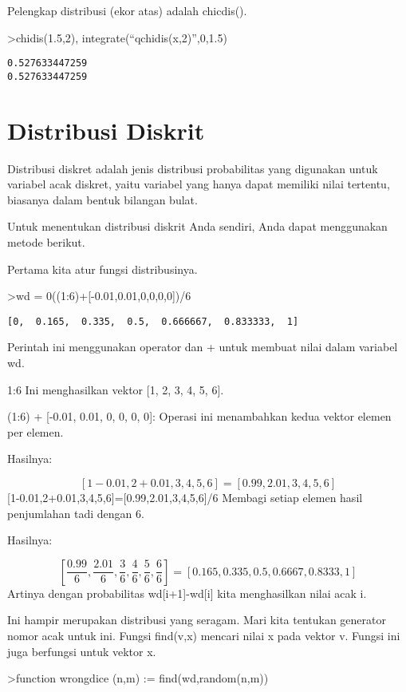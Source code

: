 \documentclass[
]{book}
\begin{document}
Pelengkap distribusi (ekor atas) adalah chicdis().

\textgreater chidis(1.5,2), integrate(``qchidis(x,2)'',0,1.5)

\begin{verbatim}
0.527633447259
0.527633447259
\end{verbatim}

\chapter{Distribusi Diskrit}\label{distribusi-diskrit}

Distribusi diskret adalah jenis distribusi probabilitas yang digunakan untuk variabel acak diskret, yaitu variabel yang hanya dapat memiliki nilai tertentu, biasanya dalam bentuk bilangan bulat.

Untuk menentukan distribusi diskrit Anda sendiri, Anda dapat menggunakan metode berikut.

Pertama kita atur fungsi distribusinya.

\textgreater wd = 0\textbar((1:6)+{[}-0.01,0.01,0,0,0,0{]})/6

\begin{verbatim}
[0,  0.165,  0.335,  0.5,  0.666667,  0.833333,  1]
\end{verbatim}

Perintah ini menggunakan operator \textbar{} dan + untuk membuat nilai dalam variabel wd.

1:6 Ini menghasilkan vektor {[}1, 2, 3, 4, 5, 6{]}.

(1:6) + {[}-0.01, 0.01, 0, 0, 0, 0{]}: Operasi ini menambahkan kedua vektor elemen per elemen.

Hasilnya:~

\[[1-0.01, 2+0.01, 3, 4, 5, 6] = [0.99, 2.01, 3, 4, 5, 6]\]{[}1-0.01,2+0.01,3,4,5,6{]}={[}0.99,2.01,3,4,5,6{]}/6 Membagi setiap elemen hasil penjumlahan tadi dengan 6.

Hasilnya:

\[[\frac {0.99}{6}, \frac {2.01}{6}, \frac {3}{6}, \frac {4}{6}, \frac {5}{6}, \frac {6}{6}] = [0.165, 0.335, 0.5,0.6667, 0.8333, 1]\]Artinya dengan probabilitas wd{[}i+1{]}-wd{[}i{]} kita menghasilkan nilai acak i.

Ini hampir merupakan distribusi yang seragam. Mari kita tentukan generator nomor acak untuk ini. Fungsi find(v,x) mencari nilai x pada vektor v. Fungsi ini juga berfungsi untuk vektor x.

\textgreater function wrongdice (n,m) := find(wd,random(n,m))
\end{document}
